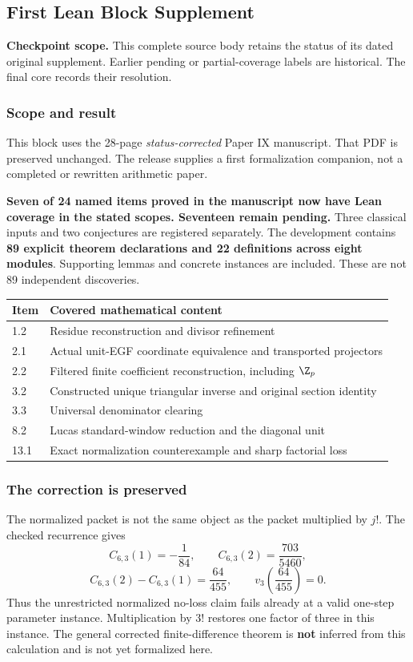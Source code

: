 \clearpage\subsection{First Lean Block Supplement}\label{app:sup1}
\noindent\textbf{Checkpoint scope.} This complete source body retains the status of its dated original supplement. Earlier pending or partial-coverage labels are historical. The final core records their resolution.\par\medskip
\subsubsection*{Scope and result}
This block uses the 28-page \emph{status-corrected} Paper IX manuscript. That PDF is preserved unchanged. The release supplies a first formalization companion, not a completed or rewritten arithmetic paper.

\textbf{Seven of 24 named items proved in the manuscript now have Lean coverage in the stated scopes. Seventeen remain pending.} Three classical inputs and two conjectures are registered separately. The development contains \textbf{89 explicit theorem declarations and 22 definitions across eight modules}. Supporting lemmas and concrete instances are included. These are not 89 independent discoveries.

\begin{center}
\begin{tabular}{@{}p{}p{}@{}}
\toprule
Item & Covered mathematical content\\\midrule
1.2 & Residue reconstruction and divisor refinement\\
2.1 & Actual unit-EGF coordinate equivalence and transported projectors\\
2.2 & Filtered finite coefficient reconstruction, including $\Z_p$\\
3.2 & Constructed unique triangular inverse and original section identity\\
3.3 & Universal denominator clearing\\
8.2 & Lucas standard-window reduction and the diagonal unit\\
13.1 & Exact normalization counterexample and sharp factorial loss\\
\bottomrule
\end{tabular}
\end{center}

\subsubsection*{The correction is preserved}
The normalized packet is not the same object as the packet multiplied by $j!$. The checked recurrence gives
\[
 C_{6,3}(1)=-\frac1{84},\qquad C_{6,3}(2)=\frac{703}{5460},
\]
\[
 C_{6,3}(2)-C_{6,3}(1)=\frac{64}{455},\qquad
 v_3\!\left(\frac{64}{455}\right)=0.
\]
Thus the unrestricted normalized no-loss claim fails already at a valid one-step parameter instance. Multiplication by $3!$ restores one factor of three in this instance. The general corrected finite-difference theorem is \textbf{not} inferred from this calculation and is not yet formalized here.

